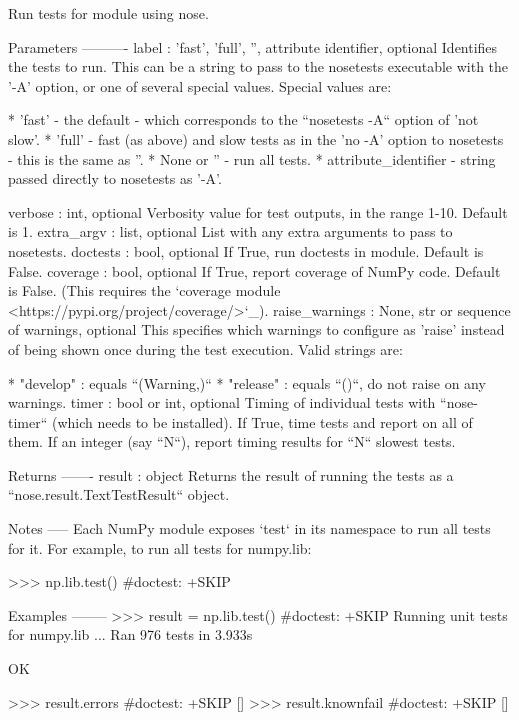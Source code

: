 \begin{DoxyVerb}Run tests for module using nose.

Parameters
----------
label : {'fast', 'full', '', attribute identifier}, optional
    Identifies the tests to run. This can be a string to pass to
    the nosetests executable with the '-A' option, or one of several
    special values.  Special values are:

    * 'fast' - the default - which corresponds to the ``nosetests -A``
      option of 'not slow'.
    * 'full' - fast (as above) and slow tests as in the
      'no -A' option to nosetests - this is the same as ''.
    * None or '' - run all tests.
    * attribute_identifier - string passed directly to nosetests as '-A'.

verbose : int, optional
    Verbosity value for test outputs, in the range 1-10. Default is 1.
extra_argv : list, optional
    List with any extra arguments to pass to nosetests.
doctests : bool, optional
    If True, run doctests in module. Default is False.
coverage : bool, optional
    If True, report coverage of NumPy code. Default is False.
    (This requires the
    `coverage module <https://pypi.org/project/coverage/>`_).
raise_warnings : None, str or sequence of warnings, optional
    This specifies which warnings to configure as 'raise' instead
    of being shown once during the test execution. Valid strings are:

    * "develop" : equals ``(Warning,)``
    * "release" : equals ``()``, do not raise on any warnings.
timer : bool or int, optional
    Timing of individual tests with ``nose-timer`` (which needs to be
    installed).  If True, time tests and report on all of them.
    If an integer (say ``N``), report timing results for ``N`` slowest
    tests.

Returns
-------
result : object
    Returns the result of running the tests as a
    ``nose.result.TextTestResult`` object.

Notes
-----
Each NumPy module exposes `test` in its namespace to run all tests for it.
For example, to run all tests for numpy.lib:

>>> np.lib.test() #doctest: +SKIP

Examples
--------
>>> result = np.lib.test() #doctest: +SKIP
Running unit tests for numpy.lib
...
Ran 976 tests in 3.933s

OK

>>> result.errors #doctest: +SKIP
[]
>>> result.knownfail #doctest: +SKIP
[]
\end{DoxyVerb}
 

